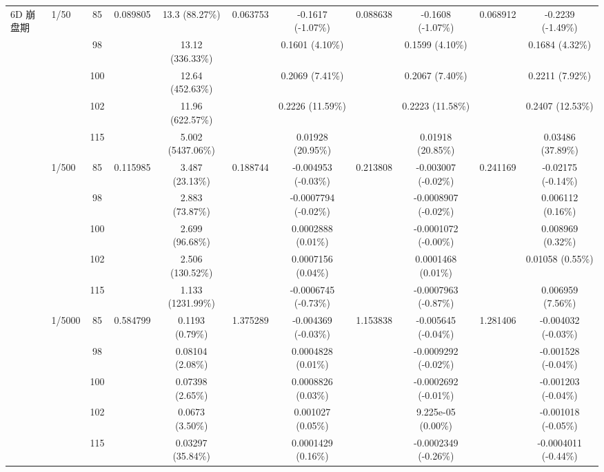 \begin{table}[htbp]
{\begin{tabular}{llccccccccc}
\multirow{15}{*}{6D 崩盘期}
& \multirow{5}{*}{1/50} & 85 & \multirow{5}{*}{0.089805} & 13.3 (88.27\%) & \multirow{5}{*}{0.063753} & -0.1617 (-1.07\%) & \multirow{5}{*}{0.088638} & -0.1608 (-1.07\%) & \multirow{5}{*}{0.068912} & -0.2239 (-1.49\%) \\
& & 98 & & 13.12 (336.33\%) & & 0.1601 (4.10\%) & & 0.1599 (4.10\%) & & 0.1684 (4.32\%) \\
& & 100 & & 12.64 (452.63\%) & & 0.2069 (7.41\%) & & 0.2067 (7.40\%) & & 0.2211 (7.92\%) \\
& & 102 & & 11.96 (622.57\%) & & 0.2226 (11.59\%) & & 0.2223 (11.58\%) & & 0.2407 (12.53\%) \\
& & 115 & & 5.002 (5437.06\%) & & 0.01928 (20.95\%) & & 0.01918 (20.85\%) & & 0.03486 (37.89\%) \\
\cmidrule(lr){2-11}
& \multirow{5}{*}{1/500} & 85 & \multirow{5}{*}{0.115985} & 3.487 (23.13\%) & \multirow{5}{*}{0.188744} & -0.004953 (-0.03\%) & \multirow{5}{*}{0.213808} & -0.003007 (-0.02\%) & \multirow{5}{*}{0.241169} & -0.02175 (-0.14\%) \\
& & 98 & & 2.883 (73.87\%) & & -0.0007794 (-0.02\%) & & -0.0008907 (-0.02\%) & & 0.006112 (0.16\%) \\
& & 100 & & 2.699 (96.68\%) & & 0.0002888 (0.01\%) & & -0.0001072 (-0.00\%) & & 0.008969 (0.32\%) \\
& & 102 & & 2.506 (130.52\%) & & 0.0007156 (0.04\%) & & 0.0001468 (0.01\%) & & 0.01058 (0.55\%) \\
& & 115 & & 1.133 (1231.99\%) & & -0.0006745 (-0.73\%) & & -0.0007963 (-0.87\%) & & 0.006959 (7.56\%) \\
\cmidrule(lr){2-11}
& \multirow{5}{*}{1/5000} & 85 & \multirow{5}{*}{0.584799} & 0.1193 (0.79\%) & \multirow{5}{*}{1.375289} & -0.004369 (-0.03\%) & \multirow{5}{*}{1.153838} & -0.005645 (-0.04\%) & \multirow{5}{*}{1.281406} & -0.004032 (-0.03\%) \\
& & 98 & & 0.08104 (2.08\%) & & 0.0004828 (0.01\%) & & -0.0009292 (-0.02\%) & & -0.001528 (-0.04\%) \\
& & 100 & & 0.07398 (2.65\%) & & 0.0008826 (0.03\%) & & -0.0002692 (-0.01\%) & & -0.001203 (-0.04\%) \\
& & 102 & & 0.0673 (3.50\%) & & 0.001027 (0.05\%) & & 9.225e-05 (0.00\%) & & -0.001018 (-0.05\%) \\
& & 115 & & 0.03297 (35.84\%) & & 0.0001429 (0.16\%) & & -0.0002349 (-0.26\%) & & -0.0004011 (-0.44\%) \\
\midrule


\end{tabular}}
\end{table}
